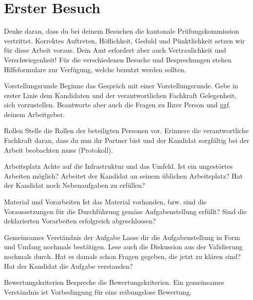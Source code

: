 \chapter{Erster Besuch}
Denke daran, dass du bei deinem Besuchen die kantonale Prüfungskommission vertrittst. Korrektes Auftreten, Höflichkeit, Geduld und Pünktlichkeit setzen wir für diese Arbeit voraus. Dein Amt erfordert aber auch Vertraulichkeit und Verschwiegenheit! Für die verschiedenen Besuche und Besprechungen stehen Hilfsformulare zur Verfügung, welche benutzt werden sollten.

\begin{taskitem}{Vorstellungsrunde}
  Beginne das Gespräch mit einer Vorstellungsrunde. Gebe in erster Linie dem Kandidaten und der verantwortlichen Fachkraft Gelegenheit, sich vorzustellen. Beantworte aber auch die Fragen zu Ihrer Person und ggf. deinem Arbeitgeber.
\end{taskitem}
\begin{taskitem}{Rollen}
  Stelle die Rollen der beteiligten Personen vor. Erinnere die verantwortliche Fachkraft daran, dass du nun ihr Partner bist und der Kandidat sorgfältig bei der Arbeit beobachten muss (Protokoll).
\end{taskitem}
\begin{taskitem}{Arbeitsplatz}
  Achte auf die Infrastruktur und das Umfeld. Ist ein ungestörtes Arbeiten möglich? Arbeitet der Kandidat an seinem üblichen Arbeitsplatz? Hat der Kandidat noch Nebenaufgaben zu erfüllen?
\end{taskitem}
\begin{taskitem}{Material und Vorarbeiten}
  Ist das Material vorhanden, bzw. sind die Voraussetzungen für die Durchführung gemäss Aufgabenstellung erfüllt? Sind die deklarierten Vorarbeiten erfolgreich abgeschlossen?
\end{taskitem}
\begin{taskitem}{Gemeinsames Verständnis der Aufgabe}
  Lasse dir die Aufgabenstellung in Form und Umfang nochmals bestätigen. Lese auch die Diskussion aus der Validierung nochmals durch. Hat es damals schon Fragen gegeben, die jetzt zu klären sind? Hat der Kandidat die Aufgabe verstanden?
\end{taskitem}
\begin{taskitem}{Bewertungskriterien}
  Bespreche die Bewertungskriterien. Ein gemeinsames Verständnis ist Vorbedingung für eine reibungslose Bewertung.
\end{taskitem}
